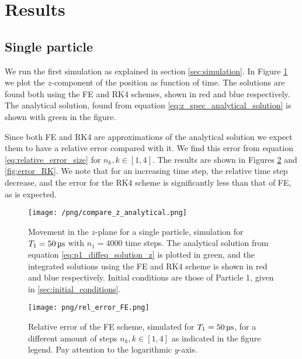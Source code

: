 \section{Results}\label{sec:results}

\subsection{Single particle}\label{sec:one_particle}
We run the first simulation as explained in section \ref{sec:simulation}. In Figure \ref{fig:compare_z_analytical} we plot the $z$-component of the position as function of time. The solutions are found both using the FE and RK4 schemes, shown in red and blue respectively. The analytical solution, found from equation \eqref{eq:z_spec_analytical_solution} is shown with green in the figure.

Since both FE and RK4 are approximations of the analytical solution we expect them to have a relative error compared with it. We find this error from equation \eqref{eq:relative_error_size} for $n_k, k\in[1,4]$. The results are shown in Figures \ref{fig:error_FE} and \ref{fig:error_RK}. We note that for an increasing time step, the relative time step decrease, and the error for the RK4 scheme is significantly less than that of FE, as is expected.

\begin{figure}
    \texttt{[image: /png/compare\_z\_analytical.png]}
    \caption{Movement in the $z$-plane for a single particle, simulation for $T_1=50\,\mus$ with $n_1=4000$ time steps. The analytical solution from equation \eqref{eq:p1_diffeq_solution_z} is plotted in green, and the integrated solutions using the FE and RK4 scheme is shown in red and blue respectively. Initial conditions are those of Particle 1, given in \ref{sec:initial_conditions}.}
    \label{fig:compare_z_analytical}
\end{figure}


\begin{figure}
    \texttt{[image: png/rel\_error\_FE.png]}
    \caption{Relative error of the FE scheme, simulated for $T_1=50\,\mus$, for a different amount of steps $n_k, k\in[1,4]$ as indicated in the figure legend. Pay attention to the logarithmic $y$-axis.}
    \label{fig:error_FE}
\end{figure}


